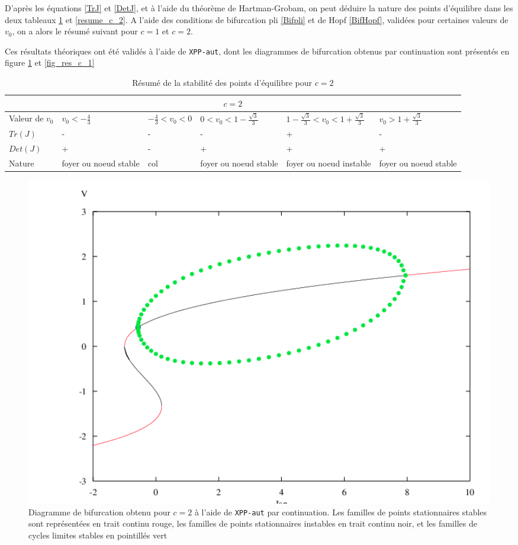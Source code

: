 \documentclass[12pt,a4paper,onecolumn]{article}
\begin{document}
D'après les équations \ref{TrJ} et \ref{DetJ}, et à l'aide du théorème de Hartman-Grobam, on peut déduire la nature des points d'équilibre dans les deux tableaux \ref{resume_c_1} et \ref{resume_c_2}.
A l'aide des conditions de bifurcation pli \ref{Bifpli} et de Hopf \ref{BifHopf}, validées pour certaines valeurs de $v_0$, on a alors le résumé suivant pour $c=1$ et $c=2$.

Ces résultats théoriques ont été validés à l'aide de \texttt{XPP-aut}, dont les diagrammes de bifurcation obtenus par continuation sont présentés en figure \ref{fig_res_c_2} et \ref{fig_res_c_1}

\newpage

\begin{table}[H]
\begin{tabular}{|L{2cm} | C{2cm} | C{2.5cm} | C{2.5cm} |C{2.5cm}|C{2.5cm}|}
\hline
{}
\\\hline
Valeur de $v_0$ & $v_0 < - \frac{4}{3}$ & $- \frac{4}{3} < v_0 < 0$ & $0 < v_0 < 1 - \frac{\sqrt{3}}{3}$ & $1 - \frac{\sqrt{3}}{3} < v_0 < 1 + \frac{\sqrt{3}}{3}$ &$v_0 > 1 + \frac{\sqrt{3}}{3}$ \\
 \hline
$Tr(J)$ & - & - & - & + & - \\ \hline
$Det(J)$ & + & - & + & + &+ \\ \hline
Nature & foyer ou noeud stable  & col & foyer ou noeud stable & foyer ou noeud instable & foyer ou noeud stable \\ \hline
\end{tabular}
\caption{Résumé de la stabilité des points d'équilibre pour $c = 2$}
\label{resume_c_1}
\end{table}

\begin{figure}[H]
\begin{center}
\includegraphics[width = 1.0\textwidth]{bif_20.png}
\end{center}
\caption{Diagramme de bifurcation obtenu pour $c=2$ à l'aide de \texttt{XPP-aut} par continuation. Les familles de points stationnaires stables sont représentées en trait continu rouge, les familles de points stationnaires instables en trait continu noir, et les familles de cycles limites stables en pointillés vert}
\label{fig_res_c_2}
\end{figure}
\end{document}
